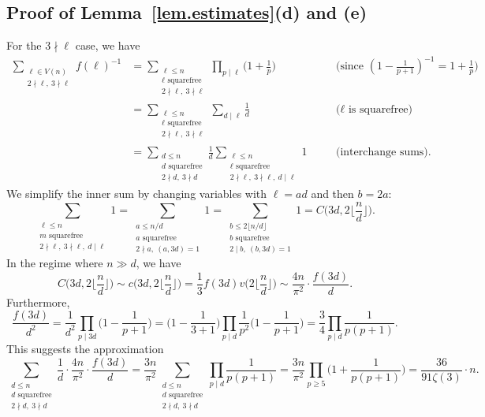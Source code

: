 \documentclass{article}
\theoremstyle{plain}
\theoremstyle{definition}
\theoremstyle{remark}
\begin{document}
\subsection{Proof of Lemma~\ref{lem.estimates}(d) and (e)}

For the $3\nmid\ell$ case, we have
\[
\begin{aligned}
\sum_{\substack{\ell\in V(n)\\2\nmid\ell,~3\nmid\ell}}f(\ell)^{-1}
&=\sum_{\substack{\ell\leq n\\\ell\text{ squarefree}\\2\nmid\ell,~3\nmid\ell}}\prod_{p\mid\ell}\bigg(1+\frac{1}{p}\bigg)&&\text{(since $(1-\tfrac{1}{p+1})^{-1}=1+\tfrac{1}{p}$)}\\
&=\sum_{\substack{\ell\leq n\\\ell\text{ squarefree}\\2\nmid \ell,~3\nmid \ell}}\sum_{d\mid \ell}\frac{1}{d}&&\text{($\ell$ is squarefree)}\\
&=\sum_{\substack{d\leq n\\d\text{ squarefree}\\2\nmid d,~3\nmid d}}\frac{1}{d}\sum_{\substack{\ell\leq n\\\ell\text{ squarefree}\\2\nmid \ell,~3\nmid \ell,~d\mid \ell}}1\quad&&\text{(interchange sums)}.
\end{aligned}
\]
We simplify the inner sum by changing variables with $\ell=ad$ and then $b=2a$:
\[
\sum_{\substack{\ell\leq n\\m\text{ squarefree}\\2\nmid\ell,~3\nmid\ell,~d\mid\ell}}1
=\sum_{\substack{a\leq n/d\\a\text{ squarefree}\\2\nmid a,~(a,3d)=1}}1
=\sum_{\substack{b\leq 2\lfloor n/d\rfloor\\b\text{ squarefree}\\2\mid b,~(b,3d)=1}}1
=C\bigg(3d,2\bigg\lfloor\frac{n}{d}\bigg\rfloor\bigg).
\]
In the regime where $n\gg d$, we have 
\[
C\bigg(3d,2\bigg\lfloor\frac{n}{d}\bigg\rfloor\bigg)
\sim c\bigg(3d,2\bigg\lfloor\frac{n}{d}\bigg\rfloor\bigg)
=\frac{1}{3}f(3d)v\bigg(2\bigg\lfloor\frac{n}{d}\bigg\rfloor\bigg)
\sim\frac{4n}{\pi^2}\cdot \frac{f(3d)}{d}.
\]
Furthermore,
\[
\frac{f(3d)}{d^2}
=\frac{1}{d^2}\prod_{p\mid3d}\bigg(1-\frac{1}{p+1}\bigg)
=\bigg(1-\frac{1}{3+1}\bigg)\prod_{p\mid d}\frac{1}{p^2}\bigg(1-\frac{1}{p+1}\bigg)
=\frac{3}{4}\prod_{p\mid d}\frac{1}{p(p+1)}.
\]
This suggests the approximation
\[
\sum_{\substack{d\leq n\\d\text{ squarefree}\\2\nmid d,~3\nmid d}}\frac{1}{d}\cdot\frac{4n}{\pi^2}\cdot \frac{f(3d)}{d}
=\frac{3n}{\pi^2}\sum_{\substack{d\leq n\\d\text{ squarefree}\\2\nmid d,~3\nmid d}}\prod_{p\mid d}\frac{1}{p(p+1)}
=\frac{3n}{\pi^2}\prod_{p\geq5}\bigg(1+\frac{1}{p(p+1)}\bigg)
=\frac{36}{91\zeta(3)}\cdot n.
\]
\end{document}
